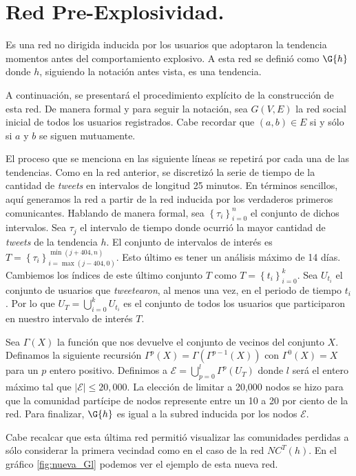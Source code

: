 \documentclass[../main.tex]{subfiles}
\begin{document}
\section{Red Pre-Explosividad.}

Es una red no dirigida inducida por los usuarios que adoptaron la tendencia momentos antes del comportamiento explosivo. A esta red se definió como $\G{h}$ donde $h$, siguiendo la notación antes vista, es una tendencia.

A continuación, se presentará el procedimiento explícito de la construcción de esta red. De manera formal y para seguir la notación, sea $G(V,E)$ la red social inicial de todos los usuarios registrados. Cabe recordar que $(a,b) \in E$ si y sólo si $a$ y $b$ se siguen mutuamente.

El proceso que se menciona en las siguiente líneas se repetirá por cada una de las tendencias. Como en la red anterior, se discretizó la serie de tiempo de la cantidad de \textit{tweets} en intervalos de longitud 25 minutos. En términos sencillos, aquí generamos la red a partir de la red inducida por los verdaderos primeros comunicantes. Hablando de manera formal, sea $\left\{ \tau_{i} \right\}_{i=0}^{n}$ el conjunto de dichos intervalos. Sea $\tau_{j}$ el intervalo de tiempo donde ocurrió la mayor cantidad de \textit{tweets} de la tendencia $h$. El conjunto de intervalos de interés es $T = \left\{ \tau_{i} \right\}_{i=\max(j - 404,0)}^{\min(j+404,n)}$. Esto último es tener un análisis máximo de 14 días. Cambiemos los índices de este último conjunto $T$ como $T = \left\{ t_{i} \right\}_{i = 0}^{k}$.
Sea $U_{t_i}$ el conjunto de usuarios que \textit{tweetearon}, al menos una vez, en el periodo de tiempo $t_i$. Por lo que $U_T = \bigcup_{i = 0}^{k} U_{t_i} $ es el conjunto de todos los usuarios que participaron en nuestro intervalo de interés $T$.

Sea $\Gamma(X)$ la función que nos devuelve el conjunto de vecinos del conjunto $X$. Definamos la siguiente recursión $\Gamma^{p}(X) = \Gamma(\Gamma^{p-1}(X)) $ con $\Gamma^{0}(X) = X $ para un $p$ entero positivo. Definimos a $\mathcal{E} = \bigcup_{p = 0}^{l} \Gamma^{p}(U_T)$ donde $l$ será el entero máximo tal que $\left| \mathcal{E} \right| \leq 20,000$. La elección de limitar a 20,000 nodos se hizo para que la comunidad partícipe de nodos represente entre un 10 a 20 por ciento de la red. Para finalizar, $\G{h}$ es igual a la subred inducida por los nodos $\mathcal{E}$.

Cabe recalcar que esta última red permitió visualizar las comunidades perdidas a sólo considerar la primera vecindad como en el caso de la red $NC^{T}(h)$. En el gráfico \ref{fig:nueva_Gl} podemos ver el ejemplo de esta nueva red.
\end{document}
